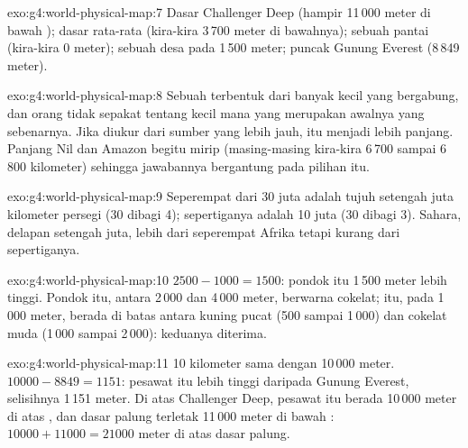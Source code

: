 \begin{solution}{exo:g4:world-physical-map:7}
Dasar Challenger Deep (hampir 11\,000 meter di bawah ); dasar
 rata-rata (kira-kira 3\,700 meter di bawahnya); sebuah pantai
(kira-kira 0 meter); sebuah desa pada 1\,500 meter; puncak Gunung Everest
(8\,849 meter).
\end{solution}

\begin{solution}{exo:g4:world-physical-map:8}
Sebuah  terbentuk dari banyak  kecil yang bergabung, dan orang
tidak sepakat tentang  kecil mana yang merupakan awalnya yang
sebenarnya. Jika diukur dari sumber yang lebih jauh,  itu menjadi
lebih panjang. Panjang Nil dan Amazon begitu mirip (masing-masing kira-kira
6\,700 sampai 6\,800 kilometer) sehingga jawabannya bergantung pada pilihan
itu.
\end{solution}

\begin{solution}{exo:g4:world-physical-map:9}
Seperempat dari 30 juta adalah tujuh setengah juta kilometer persegi (30
dibagi 4); sepertiganya adalah 10 juta (30 dibagi 3). Sahara, delapan
setengah juta, lebih dari seperempat Afrika tetapi kurang dari sepertiganya.
\end{solution}

\begin{solution}{exo:g4:world-physical-map:10}
$2500 - 1000 = 1500$: pondok itu 1\,500 meter lebih tinggi. Pondok itu,
antara 2\,000 dan 4\,000 meter, berwarna cokelat;  itu, pada
1\,000 meter, berada di batas antara kuning pucat (500 sampai 1\,000) dan
cokelat muda (1\,000 sampai 2\,000): keduanya diterima.
\end{solution}

\begin{solution}{exo:g4:world-physical-map:11}
10 kilometer sama dengan 10\,000 meter. $10000 - 8849 = 1151$: pesawat itu
lebih tinggi daripada Gunung Everest, selisihnya 1\,151 meter. Di atas
Challenger Deep, pesawat itu berada 10\,000 meter di atas , dan dasar
palung terletak 11\,000 meter di bawah : $10000 + 11000 = 21000$ meter
di atas dasar palung.
\end{solution}
